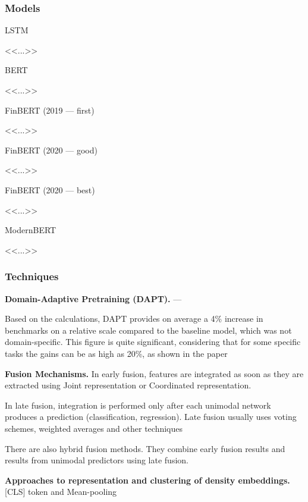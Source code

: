 \subsubsection{Models}
LSTM \parencite{Hochreiter1997LSTM}

<<...>>

BERT \parencite{devlin2019BERT}

<<...>>

FinBERT (2019 --- first) \parencite{Araci2019FinBERT}

<<...>>

FinBERT (2020 --- good) \parencite{Yang2020FinBERT, Huang2023FinBERT}

<<...>>

FinBERT (2020 --- best) \parencite{Liu2020FinBERT}

<<...>>

ModernBERT \parencite{Warner2024ModernBERT}

<<...>>

\subsubsection{Techniques}
\textbf{Domain-Adaptive Pretraining (DAPT).} --- \parencite{gururangan2020DAPT}

Based on the calculations, DAPT provides on average a 4\% increase in benchmarks on a relative scale compared to the baseline model,
which was not domain-specific. This figure is quite significant, considering that for some specific tasks the gains can be as high as 20\%,
as shown in the paper \parencite*{gururangan2020DAPT}

\textbf{Fusion Mechanisms.} In early fusion, features are integrated as soon as they are extracted using Joint representation or Coordinated
representation.

In late fusion, integration is performed only after each unimodal network produces a prediction (classification, regression). Late fusion usually
uses voting schemes, weighted averages and other techniques

There are also hybrid fusion methods. They combine early fusion results and results from unimodal predictors using late fusion.

\textbf{Approaches to representation and clustering of density embeddings.} [CLS] token and Mean-pooling

